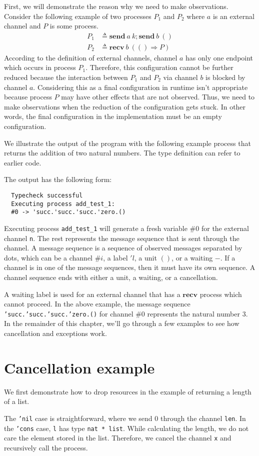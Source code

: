 \documentclass[12pt, openany]{memoir}
\newcommand*{\send}[2]{\textbf{send}\ #1\ #2}
\newcommand*{\recv}[2]{\textbf{recv}\ #1\ #2}
\begin{document}
First, we will demonstrate the reason why we need to make observations. Consider the following example of two processes $P_1$ and $P_2$ where $a$ is an external channel and $P$ is some process.
\begin{align*}
  P_1 & \triangleq \send{a}{k}; \send{b}{()}\\
  P_2 & \triangleq \recv{b}{(() \Rightarrow P)}
\end{align*}
According to the definition of external channels, channel $a$ has only one endpoint which occurs in process $P_1$. 
Therefore, this configuration cannot be further reduced because the interaction between $P_1$ and $P_2$ via channel $b$ is blocked by channel $a$. 
Considering this as a final configuration in runtime isn't appropriate because process $P$ may have other effects that are not observed. 
Thus, we need to make observations when the reduction of the configuration gets stuck. In other words, 
the final configuration in the implementation must be an empty configuration.

We illustrate the output of the program with the following example process that returns the addition of two natural numbers. 
The type definition can refer to earlier code.

The output has the following form:
\begin{verbatim}
  Typecheck successful                  
  Executing process add_test_1:
  #0 -> 'succ.'succ.'succ.'zero.()
\end{verbatim}
Executing process \texttt{add\_test\_1} will generate a fresh variable $\# 0$ for the external channel \texttt{n}. 
The rest represents the message sequence that is sent through the channel. 
A message sequence is a sequence of observed messages separated by dots, which can be a channel $\# i$, 
a label $'l$, a unit $()$, or a waiting $-$. If a channel is in one of the message sequences, 
then it must have its own sequence. A channel sequence ends with either a unit, a waiting, or a cancellation.

A waiting label is used for an external channel that has a $\textbf{recv}$ process which cannot proceed. 
In the above example, the message sequence \texttt{'succ.'succ.'succ.'zero.()} for channel $\# 0$ represents the natural number $3$. 
In the remainder of this chapter, we'll go through a few examples to see how cancellation and exceptions work.
\section{Cancellation example}
We first demonstrate how to drop resources in the example of returning a length of a list.

The \texttt{'nil} case is straightforward, where we send $0$ through the channel \texttt{len}.
In the \texttt{'cons} case, \texttt{l} has type \texttt{nat * list}.
While calculating the length, we do not care the element stored in the list.
Therefore, we cancel the channel \texttt{x} and recursively call the process.
\end{document}
